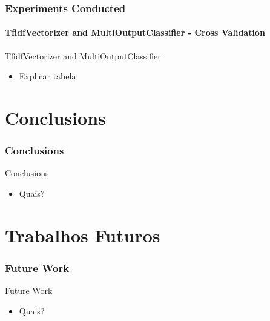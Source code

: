 \begin{frame}
	\frametitle{Experiments Conducted}
	\framesubtitle{TfidfVectorizer and MultiOutputClassifier - Cross Validation}

	\begin{exampleblock}{TfidfVectorizer and MultiOutputClassifier} 
		\begin{itemize}
			\item Explicar tabela
		\end{itemize}
	\end{exampleblock}
	
	\begin{table}
		\centering
		\resizebox{1\textwidth}{!}{
			
		}
		\caption{TfidfVectorizer and MultiOutputClassifier - Cross Validation}
	\end{table}

\end{frame}
\section{Conclusions}
\begin{frame}
	\frametitle{Conclusions}

	\begin{block}{Conclusions} 
		\begin{itemize}
			\item Quais?
		\end{itemize}
	\end{block}



\end{frame}
\section{Trabalhos Futuros}
\begin{frame}
	\frametitle{Future Work}
	\begin{block}{Future Work} 
		\begin{itemize}
			\item Quais?
		\end{itemize}
	\end{block}
\end{frame}


















